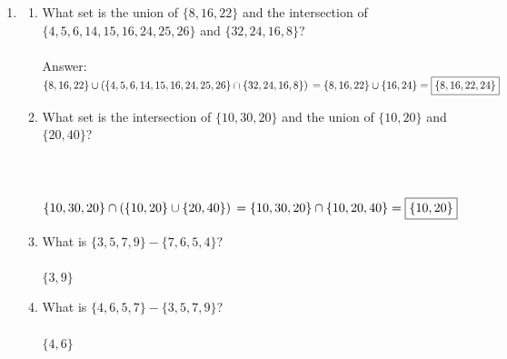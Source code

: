 \documentclass[12pt]{article}
\begin{document}
  
\pagestyle{empty}
 




\begin{enumerate}





\item
\begin{enumerate}
\item What set is the union of  $\{8,16, 22\}$ and the intersection of  $\{4,5,6,14,15,16,24,25,26\}$ and  $\{32,24,16,8\}$?\\\\


{\color{blue}
Answer: \\ 
$ 
 \{8,16,22\} \cup \left(\{4,5,6,14,15,16,24,25,26\} \cap \{32,24,16,8\}\right) \\
= \{8,16,22\} \cup \{16,24\} \\
= \boxed{\{8,16,22,24\}}
$
} 



\item What set is the intersection of  $\{10, 30, 20\}$ and the union of  $\{10, 20\}$ and  $\{20, 40\}$?\\\\\\\\

  {\color{blue}
  $\{10,30,20\}\cap \left(\{10,20\}\cup\{20,40\}\right)\\
  = \{10,30,20 \} \cap \{10,20,40\} \\
  = \boxed{\{10,20 \}}
  $
  }

\item What is $\{3,5,7,9\} - \{7,6,5,4\}$?\\\\
 
  {\color{blue}
$
\boxed{\{3,9\}}
$
}

\item What is $\{4,6,5,7\} - \{3,5,7,9\}$?\\\\
  {\color{blue}
$
\boxed{\{ 4,6 \}}
$
  }


\end{enumerate}
\end{enumerate}
\end{document}

